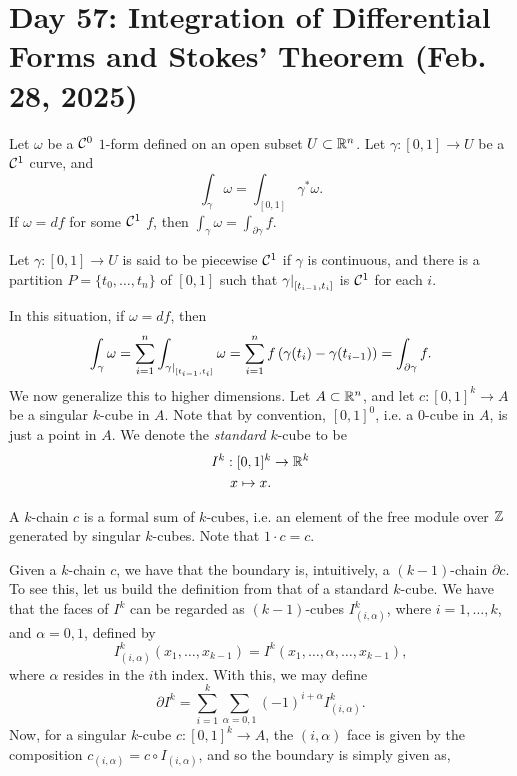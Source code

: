 \section{Day 57: Integration of Differential Forms and Stokes' Theorem (Feb. 28, 2025)}
Let $\omega$ be a $\mathcal C^0$ $1$-form defined on an open subset $U \subset \mathbb R^n$. Let $\gamma : [0, 1] \to U$ be a $\mathcal C^1$ curve, and
\[ \int_\gamma \omega = \int_{[0, 1]} \gamma^\ast \omega. \]
If $\omega = df$ for some $\mathcal C^1$ $f$, then $\int_\gamma \omega = \int_{\partial \gamma} f$.
\begin{definition}
    Let $\gamma : [0, 1] \to U$ is said to be piecewise $\mathcal C^1$ if $\gamma$ is continuous, and there is a partition $P = \{t_0, \dots, t_n\}$ of $[0, 1]$ such that $\restr{\gamma}{[t_{i-1}, t_i]}$ is $\mathcal C^1$ for each $i$.
\end{definition}
\noindent In this situation, if $\omega = df$, then
\[ \int_\gamma \omega = \sum_{i=1}^n \int_{\restr{\gamma}{[t_{i-1}, t_i]}} \omega = \sum_{i=1}^n f\left(\gamma(t_i) - \gamma(t_{i-1})\right) = \int_{\partial \gamma} f. \]
We now generalize this to higher dimensions. Let $A \subset \mathbb R^n$, and let $c : [0, 1]^k \to A$ be a singular $k$-cube in $A$. Note that by convention, $[0, 1]^0$, i.e. a $0$-cube in $A$, is just a point in $A$. We denote the \textit{standard} $k$-cube to be
\begin{align*}
    I^k : [0, 1]^k &\to \mathbb R^k \\
    x \mapsto x.
\end{align*}
\vspace{-0.37in}
\begin{definition}
    A $k$-chain $c$ is a formal sum of $k$-cubes, i.e. an element of the free module over $\mathbb Z$ generated by singular $k$-cubes. Note that $1 \cdot c = c$.
\end{definition}
\noindent Given a $k$-chain $c$, we have that the boundary is, intuitively, a $(k-1)$-chain $\partial c$. To see this, let us build the definition from that of a standard $k$-cube. We have that the faces of $I^k$ can be regarded as $(k-1)$-cubes $I^k_{(i, \alpha)}$, where $i = 1, \dots, k$, and $\alpha = 0, 1$, defined by
\[ I^k_{(i, \alpha)} (x_1, \dots, x_{k-1}) = I^k (x_1, \dots, \alpha, \dots, x_{k-1}), \]
where $\alpha$ resides in the $i$th index. With this, we may define
\[ \partial I^k = \sum_{i=1}^k \sum_{\alpha = 0, 1} (-1)^{i + \alpha} I^k_{(i, \alpha)}. \]
Now, for a singular $k$-cube $c : [0, 1]^k \to A$, the $(i, \alpha)$ face is given by the composition $c_{(i, \alpha)} = c \circ I_{(i, \alpha)}$, and so the boundary is simply given as,
